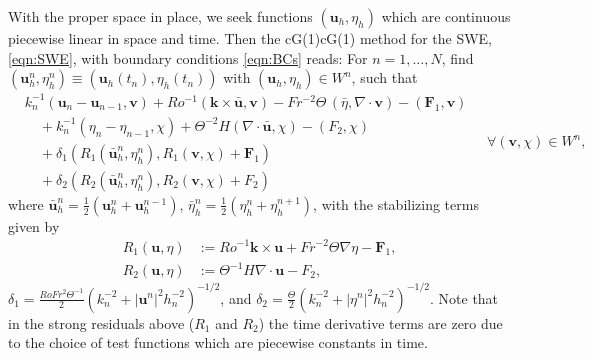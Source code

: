 With the proper space in place, we seek functions $(\mathbf{u}_h, \eta_h)$ which
are continuous piecewise linear in space and time. Then the cG(1)cG(1) method
for the SWE, \eqref{eqn:SWE}, with boundary conditions \eqref{eqn:BCs} reads:
For $n = 1, \dots, N$, find $(\mathbf{u}_h^n, \eta_h^n) \equiv
(\mathbf{u}_h(t_n), \eta_h(t_n))$ with $(\mathbf{u}_h, \eta_h) \in W^n$, such
that
\begin{equation}
  \begin{split}
    &k_n^{-1}(\mathbf{u}_n - \mathbf{u}_{n-1}, \mathbf{v}) + Ro^{-1}(\mathbf{k} \times
    \bar{\mathbf{u}}, \mathbf{v}) - Fr^{-2}\Theta\,(\bar{\eta}, \nabla\cdot \mathbf{v}) -
        (\mathbf{F}_1,\mathbf{v}) \\
    &\quad+ k_n^{-1}(\eta_n - \eta_{n-1}, \chi) 
      + \Theta^{-2}H (\nabla\cdot \bar{\mathbf{u}},\chi) - (F_2,\chi)\\
    &\quad+ \delta_1 ( R_1(\bar{\mathbf{u}}_h^n, \eta_h^n),
      R_1(\mathbf{v}, \chi) + \mathbf{F}_1) \\
    &\quad+ \delta_2 (R_2(\bar{\mathbf{u}}_h^n, \eta_h^n),
        R_2(\mathbf{v}, \chi) + F_2)
  \end{split}
  \quad \forall (\mathbf{v},\chi) \in W^n,
  \label{eqn:cG1cG1}
\end{equation}
where $\bar{\mathbf{u}}_h^n = \frac{1}{2}(\mathbf{u}_h^n + \mathbf{u}_h^{n-1}),\,
\bar{\eta}_h^n = \frac{1}{2}(\eta_h^n + \eta_h^{n+1})$, with the stabilizing
terms given by
\begin{align*}
  R_1(\mathbf{u},\eta) &:= Ro^{-1}\mathbf{k} \times \mathbf{u} 
    + Fr^{-2} \Theta \nabla \eta - \mathbf{F}_1, \\
  R_2(\mathbf{u},\eta) &:= \Theta^{-1} H \nabla\cdot \mathbf{u} - F_2,
\end{align*}
$\delta_1 = \frac{RoFr^2\Theta^{-1}}{2}(k_n^{-2} + |\mathbf{u}^n|^2 h_n^{-2})^{-1/2}$, and
$\delta_2 = \frac{\Theta}{2}(k_n^{-2} + |\eta^n|^2 h_n^{-2})^{-1/2}$. Note that in
the strong residuals above ($R_1$ and $R_2$) the time derivative terms are zero
due to the choice of test functions which are piecewise constants in time.
